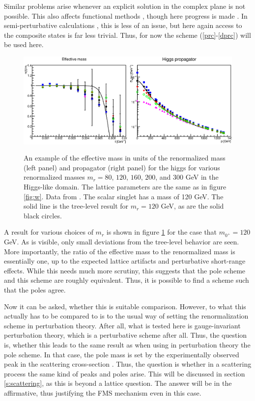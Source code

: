 \documentclass[final,12pt,3p,longtitle]{elsarticle}
\newcommand*{\prefr}[2]{(\ref{#1}-\ref{#2})}
\newcommand*{\1}{1\!\!\!\bot}
\begin{document}
Similar problems arise whenever an explicit solution in the complex plane is not possible. This also affects functional methods \cite{Benes:2008ir,Fister:2010yw,Gies:2015lia}, though here progress is made \cite{Strauss:2012as,Pawlowski:2015mia}. In semi-perturbative calculations \cite{Capri:2012cr,Capri:2017abz}, this is less of an issue, but here again access to the composite states is far less trivial. Thus, for now the scheme \prefr{prc}{dprc} will be used here.

\begin{figure}
\includegraphics[width=\linewidth]{h}\\
\caption{\label{fig:h}An example of the effective mass in units of the renormalized mass (left panel) and propagator (right panel) for the higgs for various renormalized masses $m_r=80$, $120$, $160$, $200$, and $300$ GeV in the Higgs-like domain. The lattice parameters are the same as in figure \ref{fig:w}. Data from \cite{Maas:2013aia,Maas:unpublished}. The scalar singlet has a mass of 120 GeV. The solid line is the tree-level result for $m_r=120$ GeV, as are the solid black circles.}
\end{figure}

A result for various choices of $m_r$ is shown in figure \ref{fig:h} for the case that $m_{0^+}=120$ GeV. As is visible, only small deviations from the tree-level behavior are seen. More importantly, the ratio of the effective mass to the renormalized mass is essentially one, up to the expected lattice artifacts and perturbative short-range effects. While this needs much more scrutiny, this suggests that the pole scheme and this scheme are roughly equivalent. Thus, it is possible to find a scheme such that the poles agree.

Now it can be asked, whether this is suitable comparison. However, to what this actually has to be compared to is to the usual way of setting the renormalization scheme in perturbation theory. After all, what is tested here is gauge-invariant perturbation theory, which is a perturbative scheme after all. Thus, the question is, whether this leads to the same result as when using in perturbation theory the pole scheme. In that case, the pole mass is set by the experimentally observed peak in the scattering cross-section \cite{Bohm:2001yx,Einhorn:1992um}. Thus, the question is whether in a scattering process the same kind of peaks and poles arise. This will be discussed in section \ref{s:scattering}, as this is beyond a lattice question. The answer will be in the affirmative, thus justifying the FMS mechanism even in this case.
\end{document}
